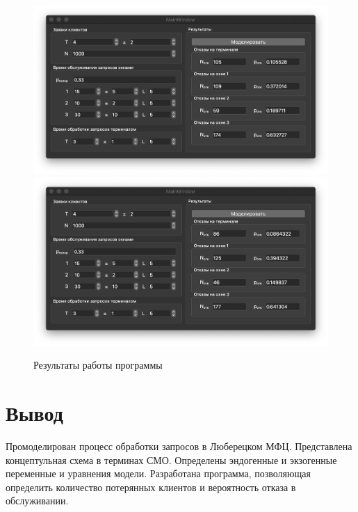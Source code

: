 \documentclass[a4paper,oneside,12pt]{extreport}
\begin{document}
\begin{figure}[H]
	\centering
	\includegraphics[width=\linewidth]{inc/img/result1.png}
	\includegraphics[width=\linewidth]{inc/img/result2.png}
	\caption{Результаты работы программы}
	\label{img:results-12}
\end{figure}

\chapter*{Вывод}

Промоделирован процесс обработки запросов в Люберецком МФЦ.
Представлена концептульная схема в терминах СМО.
Определены эндогенные и экзогенные переменные и уравнения модели.
Разработана программа, позволяющая определить количество потерянных клиентов и вероятность отказа в обслуживании.
\end{document}
